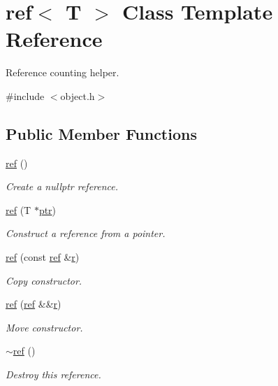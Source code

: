 \hypertarget{classref}{}\section{ref$<$ T $>$ Class Template Reference}
\label{classref}


Reference counting helper.  




{\ttfamily \#include $<$object.\+h$>$}

\subsection*{Public Member Functions}
\begin{DoxyCompactItemize}
\item 
\mbox{\hyperlink{classref_a32c2f3c2bde5b57e6ef0a80254773854}{ref}} ()
\begin{DoxyCompactList}\small\item\em Create a nullptr reference. \end{DoxyCompactList}\item 
\mbox{\hyperlink{classref_ac593e903c13a8dfe520978053ac4b319}{ref}} (T $\ast$\mbox{\hyperlink{pystrtod_8h_a671b2e1a427060ad8b5362882ed58f5b}{ptr}})
\begin{DoxyCompactList}\small\item\em Construct a reference from a pointer. \end{DoxyCompactList}\item 
\mbox{\hyperlink{classref_ab6041fce6b4a78faac0613b3b05e74e0}{ref}} (const \mbox{\hyperlink{classref}{ref}} \&\mbox{\hyperlink{_s_d_l__opengl_8h_a42ce7cdc612e53abee15043f80220d97}{r}})
\begin{DoxyCompactList}\small\item\em Copy constructor. \end{DoxyCompactList}\item 
\mbox{\hyperlink{classref_aad576503d5b820e6d1bbf33d881dc7a7}{ref}} (\mbox{\hyperlink{classref}{ref}} \&\&\mbox{\hyperlink{_s_d_l__opengl_8h_a42ce7cdc612e53abee15043f80220d97}{r}})
\begin{DoxyCompactList}\small\item\em Move constructor. \end{DoxyCompactList}\item 
\mbox{\hyperlink{classref_a0f91cf031c803c7a34471dabce694454}{$\sim$ref}} ()
\begin{DoxyCompactList}\small\item\em Destroy this reference. \end{DoxyCompactList}\item 

\end{DoxyCompactItemize}
